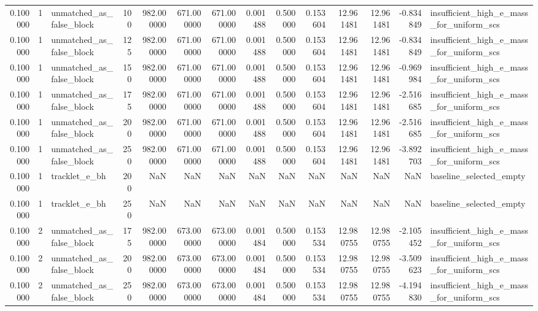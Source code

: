 \begin{tabular}{rrlrrrrrrrrrrl}
0.100000 & 1 & unmatched_as_false_block & 100 & 982.000000 & 671.000000 & 671.000000 & 0.001488 & 0.500000 & 0.153604 & 12.961481 & 12.961481 & -0.834849 & insufficient_high_e_mass_for_uniform_scs \\
0.100000 & 1 & unmatched_as_false_block & 125 & 982.000000 & 671.000000 & 671.000000 & 0.001488 & 0.500000 & 0.153604 & 12.961481 & 12.961481 & -0.834849 & insufficient_high_e_mass_for_uniform_scs \\
0.100000 & 1 & unmatched_as_false_block & 150 & 982.000000 & 671.000000 & 671.000000 & 0.001488 & 0.500000 & 0.153604 & 12.961481 & 12.961481 & -0.969984 & insufficient_high_e_mass_for_uniform_scs \\
0.100000 & 1 & unmatched_as_false_block & 175 & 982.000000 & 671.000000 & 671.000000 & 0.001488 & 0.500000 & 0.153604 & 12.961481 & 12.961481 & -2.516685 & insufficient_high_e_mass_for_uniform_scs \\
0.100000 & 1 & unmatched_as_false_block & 200 & 982.000000 & 671.000000 & 671.000000 & 0.001488 & 0.500000 & 0.153604 & 12.961481 & 12.961481 & -2.516685 & insufficient_high_e_mass_for_uniform_scs \\
0.100000 & 1 & unmatched_as_false_block & 250 & 982.000000 & 671.000000 & 671.000000 & 0.001488 & 0.500000 & 0.153604 & 12.961481 & 12.961481 & -3.892703 & insufficient_high_e_mass_for_uniform_scs \\
0.100000 & 1 & tracklet_e_bh & 200 & NaN & NaN & NaN & NaN & NaN & NaN & NaN & NaN & NaN & baseline_selected_empty \\
0.100000 & 1 & tracklet_e_bh & 250 & NaN & NaN & NaN & NaN & NaN & NaN & NaN & NaN & NaN & baseline_selected_empty \\
0.100000 & 2 & unmatched_as_false_block & 175 & 982.000000 & 673.000000 & 673.000000 & 0.001484 & 0.500000 & 0.153534 & 12.980755 & 12.980755 & -2.105452 & insufficient_high_e_mass_for_uniform_scs \\
0.100000 & 2 & unmatched_as_false_block & 200 & 982.000000 & 673.000000 & 673.000000 & 0.001484 & 0.500000 & 0.153534 & 12.980755 & 12.980755 & -3.509623 & insufficient_high_e_mass_for_uniform_scs \\
0.100000 & 2 & unmatched_as_false_block & 250 & 982.000000 & 673.000000 & 673.000000 & 0.001484 & 0.500000 & 0.153534 & 12.980755 & 12.980755 & -4.194830 & insufficient_high_e_mass_for_uniform_scs \\
\bottomrule
\end{tabular}
